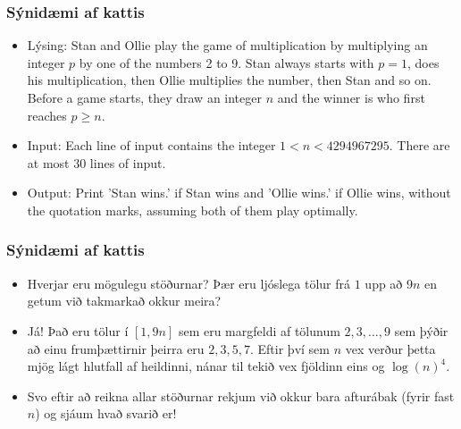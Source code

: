 \documentclass{beamer}
\begin{document}
\begin{frame}
\frametitle{Sýnidæmi af kattis}

\begin{itemize}

\item<1-> Lýsing: Stan and Ollie play the game of multiplication by multiplying an integer $p$ by one of the numbers 2 to 9. Stan always starts with $p=1$, does his multiplication, then Ollie multiplies the number, then Stan and so on. Before a game starts, they draw an integer $n$ and the winner is who first reaches $p \geq n$.

\item<2-> Input: Each line of input contains the integer $1<n<4294967295$. There are at most 30 lines of input.

\item<3-> Output: Print 'Stan wins.' if Stan wins and 'Ollie wins.' if Ollie wins, without the quotation marks, assuming both of them play optimally.

\end{itemize}

\end{frame}

\begin{frame}
\frametitle{Sýnidæmi af kattis}

\begin{itemize}

\item<1-> Hverjar eru mögulegu stöðurnar? Þær eru ljóslega tölur frá $1$ upp að $9n$ en getum við takmarkað okkur meira?

\item<2-> Já! Það eru tölur í $[1, 9n]$ sem eru margfeldi af tölunum $2, 3, \dots, 9$ sem þýðir að einu frumþættirnir þeirra eru $2, 3, 5, 7$. Eftir því sem $n$ vex verður þetta mjög lágt hlutfall af heildinni, nánar til tekið vex fjöldinn eins og $\log(n)^4$.

\item<3-> Svo eftir að reikna allar stöðurnar rekjum við okkur bara afturábak (fyrir fast $n$) og sjáum hvað svarið er!

\end{itemize}

\end{frame}
\end{document}
